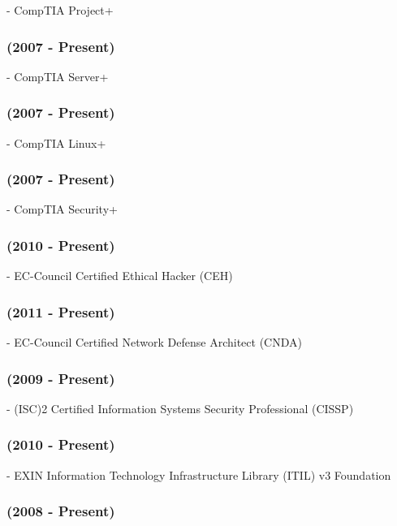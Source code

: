 \documentclass{article}
\begin{document}
{ - CompTIA Project+ } 


{\noindent}\subsubsection { {(2007 - Present)} }

{ - CompTIA Server+ } 


{\noindent}\subsubsection { {(2007 - Present)} }

{ - CompTIA Linux+ } 


{\noindent}\subsubsection { {(2007 - Present)} }

{ - CompTIA Security+ } 


{\noindent}\subsubsection { {(2010 - Present)} }

{ - EC-Council Certified Ethical Hacker (CEH) } 


{\noindent}\subsubsection { {(2011 - Present)} }

{ - EC-Council Certified Network Defense Architect (CNDA) } 


{\noindent}\subsubsection { {(2009 - Present)} }

{ - (ISC)2 Certified Information Systems Security Professional (CISSP) } 


{\noindent}\subsubsection { {(2010 - Present)} }

{ - EXIN Information Technology Infrastructure Library (ITIL) v3 Foundation } 


{\noindent}\subsubsection { {(2008 - Present)} }
\end{document}
